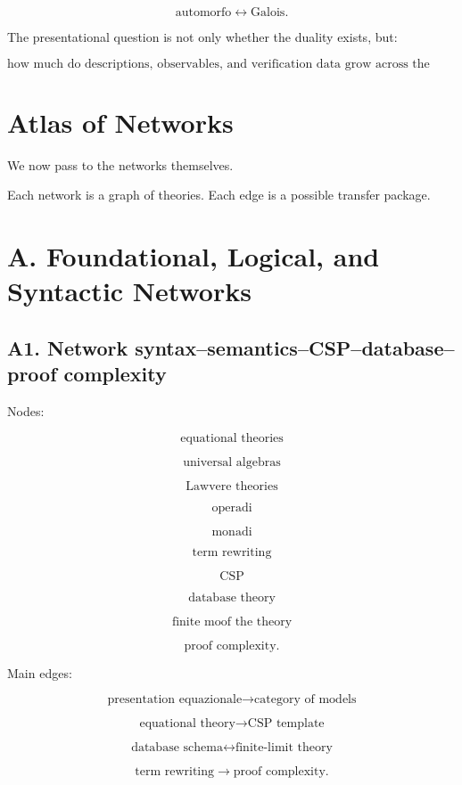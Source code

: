 \documentclass[11pt]{article}
\begin{document}
\[
\text{automorfo}
\leftrightarrow
\text{Galois}.
\]

The presentational question is not only whether the duality exists, but:

\[
\text{how much do descriptions, observables, and verification data grow across the duality?}
\]



\section{Atlas of Networks}

We now pass to the networks themselves.

Each network is a graph of theories. Each edge is a possible transfer package.



\section{A. Foundational, Logical, and Syntactic Networks}



\subsection{A1. Network syntax--semantics--CSP--database--proof complexity}

Nodes:

\[
\text{equational theories}
\]

\[
\text{universal algebras}
\]

\[
\text{Lawvere theories}
\]

\[
\text{operadi}
\]

\[
\text{monadi}
\]

\[
\text{term rewriting}
\]

\[
\text{CSP}
\]

\[
\text{database theory}
\]

\[
\text{finite moof the theory}
\]

\[
\text{proof complexity}.
\]

Main edges:

\[
\text{presentation equazionale}
\to
\text{category of models}
\]

\[
\text{equational theory}
\to
\text{CSP template}
\]

\[
\text{database schema}
\leftrightarrow
\text{finite-limit theory}
\]

\[
\text{term rewriting}
\to
\text{proof complexity}.
\]
\end{document}

